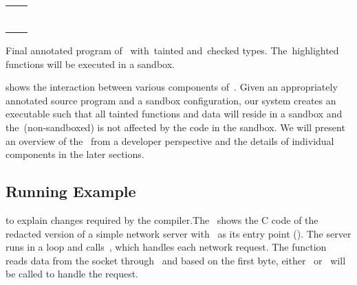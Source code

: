 \begin{listing}[t!]
  \begin{tabular}{c c}
    \begin{minipage}[b]{.22\textwidth}
\inputminted[mathescape, escapeinside=||, fontsize=\tiny{}]{c}{examples/conv1.c}
    \end{minipage} &
    \begin{minipage}[b]{.22\textwidth}
\inputminted[mathescape, highlightlines={1-19}, highlightcolor=taintcolor, escapeinside=||, fontsize=\tiny{}]{c}{examples/conv2.c}
    \end{minipage} %
  \end{tabular}
\caption{Final annotated program of~ with~\textcolor{taintcolor}{tainted} and~\textcolor{checkcolor}{checked} types. The~\colorbox{taintcolor}{highlighted} functions will be executed in a sandbox.}
\label{lst:final}
\end{listing}



 shows the interaction between various components of~\systemname{}.
Given an appropriately annotated source program and a sandbox configuration, our system creates an executable such that all tainted functions and data will reside in a sandbox and the~\cregion (non-sandboxed) is not affected by the code in the sandbox.
We will present an overview of the~\systemname{} from a developer perspective and the details of individual components in the later sections.


\subsection{Running Example}
\label{subsec:identifyregionstosbx}
to explain changes required by the \systemname compiler.The~ shows the C code of the redacted version of a simple network server with~ as its entry point (\entrypoint).
The server runs in a loop and calls~, which handles each network request.
The function~ reads data from the socket through~ and based on the first byte, either~ or~ will be called to handle the request.

